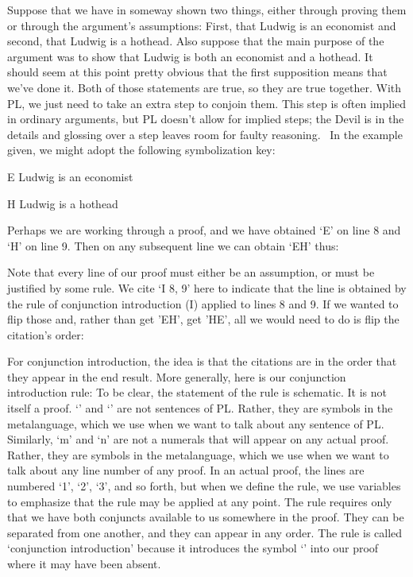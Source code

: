 Suppose that we have in someway shown two things, either through proving them or through the argument's assumptions: First, that Ludwig is an economist and second, that Ludwig is a hothead. Also suppose that the main purpose of the argument was to show that Ludwig is both an economist and a hothead. It should seem at this point pretty obvious that the first supposition means that we've done it. Both of those statements are true, so they are true together. With PL, we just need to take an extra step to conjoin them. This step is often implied in ordinary arguments, but PL doesn't allow for implied steps; the Devil is in the details and glossing over a step leaves room for faulty reasoning.  In the example given, we might adopt the following symbolization key:
\begin{ekey}
\item[E] Ludwig is an economist
\item[H] Ludwig is a hothead
\end{ekey}

Perhaps we are working through a proof, and we have obtained ‘E’ on line 8 and ‘H’ on line 9. Then on any subsequent line we can obtain ‘E\eand H’ thus:

\begin{fitchproof}
 
\end{fitchproof}
Note that every line of our proof must either be an assumption, or must be justified by some rule. We cite ‘\eand I 8, 9’ here to indicate that the line is obtained by the rule of conjunction introduction (\eand I) applied to lines 8 and 9. If we wanted to flip those and, rather than get 'E\eand H', get 'H\eand E', all we would need to do is flip the citation's order:

\begin{fitchproof}
 
\end{fitchproof}
For conjunction introduction, the idea is that the citations are in the order that they appear in the end result. More generally, here is our conjunction introduction rule:
To be clear, the statement of the rule is schematic. It is not itself a proof. ‘’ and ‘’ are not sentences of PL. Rather, they are symbols in the metalanguage, which we use when we want to talk about any sentence of PL. Similarly, ‘m’ and ‘n’ are not a numerals that will appear on any actual proof. Rather, they are symbols in the metalanguage, which we use when we want to talk about any line number of any proof. In an actual proof, the lines are numbered ‘1’, ‘2’, ‘3’, and so forth, but when we define the rule, we use variables to emphasize that the rule may be applied at any point. The rule requires only that we have both conjuncts available to us somewhere in the proof. They can be separated from one another, and they can appear in any order. The rule is called ‘conjunction introduction’ because it introduces the symbol ‘\eand ’ into our proof where it may have been absent.

